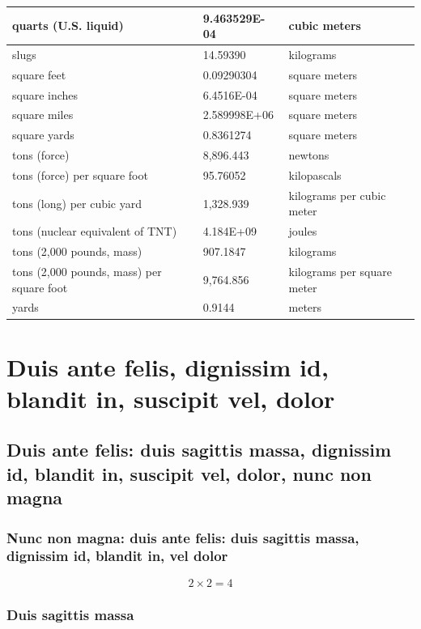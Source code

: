\documentclass{template/openetcs_report}
\begin{document}
{\begin{longtable}{||l|l|l||}
    \hline
    quarts (U.S. liquid) & 9.463529E-04 & cubic meters\\
    \hline
    slugs & 14.59390 & kilograms\\
    \hline
    square feet & 0.09290304 & square meters\\
    \hline
    square inches & 6.4516E-04 & square meters\\
    \hline
    square miles & 2.589998E+06 & square meters\\
    \hline
    square yards & 0.8361274 & square meters\\
    \hline
    tons (force) & 8,896.443 & newtons\\
    \hline
    tons (force) per square foot & 95.76052 & kilopascals\\
    \hline
    tons (long) per cubic yard & 1,328.939 & kilograms per cubic meter\\
    \hline
    tons (nuclear equivalent of TNT) & 4.184E+09 & joules\\
    \hline
    tons (2,000 pounds, mass) & 907.1847 & kilograms\\
    \hline
    tons (2,000 pounds, mass) per square foot & 9,764.856 & kilograms per square meter\\
\hline
yards & 0.9144 & meters\\
\hline
\end{longtable}}

\mainmatter

\chapter{Duis ante felis, dignissim id, blandit in, suscipit vel,
  dolor}
\section{Duis ante felis: duis sagittis massa, dignissim id, blandit
  in, suscipit vel, dolor, nunc non magna}
\subsection{Nunc non magna: duis ante felis: duis sagittis massa,
  dignissim id, blandit in, vel dolor}
\lipsum[6]

\begin{equation}
  \label{eq:eq}
  2\times2=4
\end{equation}

\subsection{Duis sagittis massa}
\end{document}
